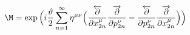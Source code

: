 \begin{equation}	\M=\exp\Big(i\frac{\vartheta}{2}\sum^{\infty}_{n=1}\eta^{\mu\nu}\Big(\frac{\overleftarrow{\partial}}{\partial x^{\mu}_{2n}}\frac{\overrightarrow{\partial}}{\partial p^{\nu}_{2n}}-\frac{\overleftarrow{\partial}}{\partial p^{\nu}_{2n}}\frac{{\overrightarrow{\partial}}}{{\partial x^{\mu}_{2n}}}\Big)\Big)
\end{equation}

